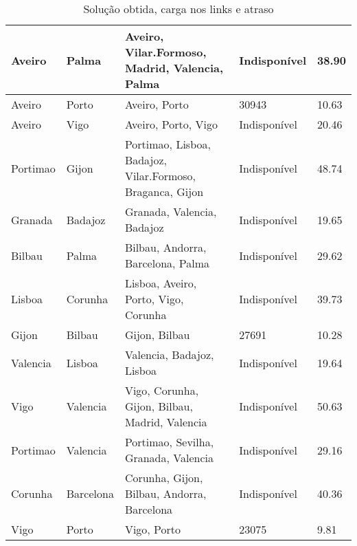 \begin{table}[!htb]
{\begin{tabular}{|l|l|l|l|l|}
Aveiro & Palma & Aveiro, Vilar.Formoso, Madrid, Valencia, Palma & Indisponível & 38.90 \\ \hline
Aveiro & Porto & Aveiro, Porto & 30943 & 10.63 \\ \hline
Aveiro & Vigo & Aveiro, Porto, Vigo & Indisponível & 20.46 \\ \hline
Portimao & Gijon & Portimao, Lisboa, Badajoz, Vilar.Formoso, Braganca, Gijon & Indisponível & 48.74 \\ \hline
Granada & Badajoz & Granada, Valencia, Badajoz & Indisponível & 19.65 \\ \hline
Bilbau & Palma & Bilbau, Andorra, Barcelona, Palma & Indisponível & 29.62 \\ \hline
Lisboa & Corunha & Lisboa, Aveiro, Porto, Vigo, Corunha & Indisponível & 39.73 \\ \hline
Gijon & Bilbau & Gijon, Bilbau & 27691 & 10.28 \\ \hline
Valencia & Lisboa & Valencia, Badajoz, Lisboa & Indisponível & 19.64 \\ \hline
Vigo & Valencia & Vigo, Corunha, Gijon, Bilbau, Madrid, Valencia & Indisponível & 50.63 \\ \hline
Portimao & Valencia & Portimao, Sevilha, Granada, Valencia & Indisponível & 29.16 \\ \hline
Corunha & Barcelona & Corunha, Gijon, Bilbau, Andorra, Barcelona & Indisponível & 40.36 \\ \hline
Vigo & Porto & Vigo, Porto & 23075 & 9.81 \\ \hline
\end{tabular}}
\caption[]{Solução obtida, carga nos links e atraso}
\end{table}

